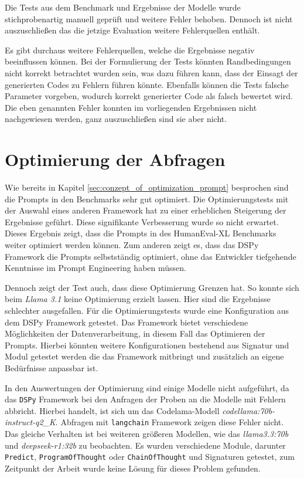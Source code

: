 Die Tests aus dem Benchmark und Ergebnisse der Modelle wurde stichprobenartig manuell geprüft und weitere Fehler behoben. Dennoch ist nicht auszuschließen das die jetzige Evaluation weitere Fehlerquellen enthält.\vspace{0.2cm}

Es gibt durchaus weitere Fehlerquellen, welche die Ergebnisse negativ beeinflussen können. Bei der Formulierung der Tests könnten Randbedingungen nicht korrekt betrachtet wurden sein, was dazu führen kann, dass der Einsagt der generierten Codes zu Fehlern führen könnte. Ebenfalls können die Tests falsche Parameter vorgeben, wodurch korrekt generierter Code als falsch bewertet wird. Die eben genannten Fehler konnten im vorliegenden Ergebnissen nicht nachgewiesen werden, ganz auszuschließen sind sie aber nicht.\vspace{0.2cm}



\section{Optimierung der Abfragen}
Wie bereits in Kapitel \ref{sec:conzept_of_optimization_prompt} besprochen sind die Prompts in den Benchmarks sehr gut optimiert. Die Optimierungstests mit der Auswahl eines anderen Framework hat zu einer erheblichen Steigerung der Ergebnisse geführt. Diese signifikante Verbesserung wurde so nicht erwartet. Dieses Ergebnis zeigt, dass die Prompts in des HumanEval-XL Benchmarks weiter optimiert werden können. Zum anderen zeigt es, dass das DSPy Framework die Prompts selbstständig optimiert, ohne das Entwickler tiefgehende Kenntnisse im Prompt Engineering haben müssen.\vspace{0.2cm}

Dennoch zeigt der Test auch, dass diese Optimierung Grenzen hat. So konnte sich beim \textit{Llama 3.1} keine Optimierung erzielt lassen. Hier sind die Ergebnisse schlechter ausgefallen. Für die Optimierungstests wurde eine Konfiguration aus dem DSPy Framework getestet. Das Framework bietet verschiedene Möglichkeiten der Datenverarbeitung, in diesem Fall das Optimieren der Prompts. Hierbei könnten weitere Konfigurationen bestehend aus Signatur und Modul getestet werden die das Framework mitbringt und zusätzlich an eigene Bedürfnisse anpassbar ist.\vspace{0.2cm}

In den Auswertungen der Optimierung sind einige Modelle nicht aufgeführt, da das \texttt{DSPy} Framework bei den Anfragen der Proben an die Modelle mit Fehlern abbricht. Hierbei handelt, ist sich um das Codelama-Modell \textit{codellama:70b-instruct-q2\_K}. Abfragen mit \texttt{langchain} Framework zeigen diese Fehler nicht. Das gleiche Verhalten ist bei weiteren größeren Modellen, wie das \textit{llama3.3:70b} und \textit{deepseek-r1:32b} zu beobachten. Es wurden verschiedene Module, darunter \texttt{Predict}, \texttt{ProgramOfThought} oder \texttt{ChainOfThought} und Signaturen getestet, zum Zeitpunkt der Arbeit wurde keine Lösung für dieses Problem gefunden.\vspace{0.2cm}

